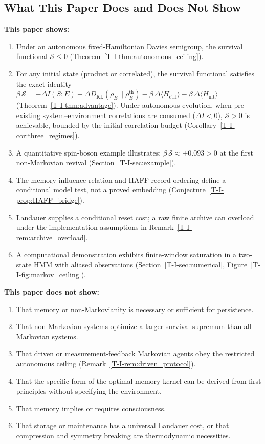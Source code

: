 \documentclass[12pt,a4paper,openany]{book}
\begin{document}
\subsection{What This Paper Does and Does Not Show}

\textbf{This paper shows:}
\begin{enumerate}
\item Under an autonomous fixed-Hamiltonian Davies semigroup,
  the survival functional $\mathcal{S} \leq 0$
  (Theorem~\ref{T-I-thm:autonomous_ceiling}).
\item For any initial state (product or correlated), the
  survival functional satisfies the exact identity
  $\beta\,\mathcal{S} = -\Delta I(S{:}E)
  - \Delta D_{\mathrm{KL}}(\rho_E \| \rho_E^{\mathrm{th}})
  - \beta\,\Delta\langle H_{\mathrm{ctrl}}\rangle
  - \beta\,\Delta\langle H_{\mathrm{int}}\rangle$
  (Theorem~\ref{T-I-thm:advantage}).
  Under autonomous evolution, when pre-existing
  system--environment correlations are consumed
  ($\Delta I < 0$), $\mathcal{S} > 0$ is achievable,
  bounded by the initial correlation budget
  (Corollary~\ref{T-I-cor:three_regimes}).
\item A quantitative spin-boson example illustrates:
  $\beta\,\mathcal{S} \approx +0.093 > 0$ at the first
  non-Markovian revival (Section~\ref{T-I-sec:example}).
\item The memory-influence relation and HAFF record ordering define a
  conditional model test, not a proved embedding
  (Conjecture~\ref{T-I-prop:HAFF_bridge}).
\item Landauer supplies a conditional reset cost; a raw finite archive
  can overload under the implementation assumptions in
  Remark~\ref{T-I-rem:archive_overload}.
\item A computational demonstration exhibits finite-window saturation
  in a two-state HMM with aliased observations
  (Section~\ref{T-I-sec:numerical},
  Figure~\ref{T-I-fig:markov_ceiling}).
\end{enumerate}

\textbf{This paper does not show:}
\begin{enumerate}
\item That memory or non-Markovianity is necessary or sufficient for
  persistence.
\item That non-Markovian systems optimize a larger survival supremum
  than all Markovian systems.
\item That driven or measurement-feedback Markovian agents obey the
  restricted autonomous ceiling (Remark~\ref{T-I-rem:driven_protocol}).
\item That the specific form of the optimal memory kernel can be
  derived from first principles without specifying the
  environment.
\item That memory implies or requires consciousness.
\item That storage or maintenance has a universal Landauer cost, or
  that compression and symmetry breaking are thermodynamic necessities.
\end{enumerate}
\end{document}
